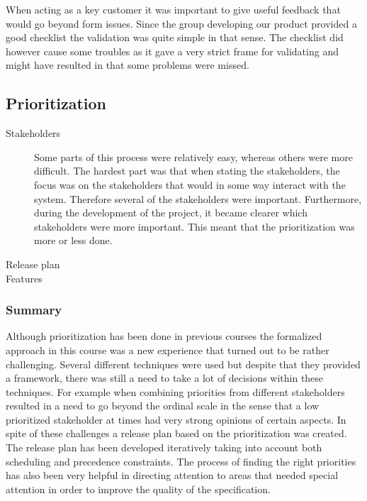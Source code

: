 \documentclass[10pt,a4paper]{article}
\begin{document}
When acting as a key customer it was important to give useful feedback that would go beyond form issues. Since the group developing our product provided a good checklist the validation was quite simple in that sense. The checklist did however cause some troubles as it gave a very strict frame for validating and might have resulted in that some problems were missed.


\subsection{Prioritization}
\begin{description}
\item[Stakeholders] Some parts of this process were relatively easy, whereas others were more difficult. The hardest part was that when stating the stakeholders, the focus was on the stakeholders that would in some way interact with the system. Therefore several of the stakeholders were important. Furthermore, during the development of the project, it became clearer which stakeholders were more important. This meant that the prioritization was more or less done.

\item[Release plan]

\item[Features]
\end{description}
\subsubsection*{Summary} Although prioritization has been done in previous courses the formalized approach in this course was  a new experience that turned out to be rather challenging. Several different techniques were used but despite that they provided a framework, there was still a need to take a lot of decisions within these techniques. For example when combining priorities from different stakeholders resulted in a need to go beyond the ordinal scale in the sense that a low prioritized stakeholder at times had very strong opinions of certain aspects. In spite of these challenges a release plan based on the prioritization was created. The release plan has been developed iteratively taking into account both scheduling and precedence constraints. The process of finding the right priorities has also been very helpful in directing attention to areas that needed special attention in order to improve the quality of the specification. 
\end{document}
